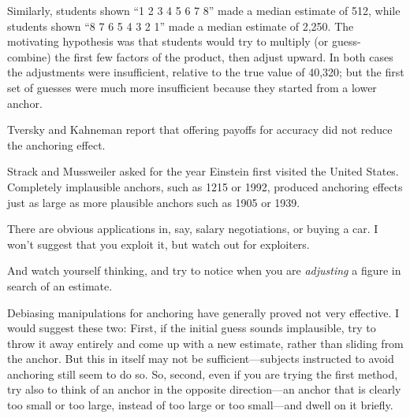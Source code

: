 {
 Similarly, students shown ``1 {\texttimes} 2
{\texttimes} 3 {\texttimes} 4 {\texttimes} 5 {\texttimes} 6
{\texttimes} 7 {\texttimes} 8'' made a median
estimate of 512, while students shown ``8 {\texttimes}
7 {\texttimes} 6 {\texttimes} 5 {\texttimes} 4 {\texttimes} 3
{\texttimes} 2 {\texttimes} 1'' made a median
estimate of 2,250. The motivating hypothesis was that students would
try to multiply (or guess-combine) the first few factors of the
product, then adjust upward. In both cases the adjustments were
insufficient, relative to the true value of 40,320; but the first set
of guesses were much more insufficient because they started from a
lower anchor.}

{
 Tversky and Kahneman report that offering payoffs for accuracy did
not reduce the anchoring effect.}

{
 Strack and Mussweiler asked for the year Einstein first visited
the United States. Completely implausible anchors,
such as 1215 or 1992, produced anchoring effects just as large as more
plausible anchors such as 1905 or 1939.}

{
 There are obvious applications in, say, salary negotiations, or
buying a car. I won't suggest that you exploit it, but
watch out for exploiters.}

{
 And watch yourself thinking, and try to notice when you are
\textit{adjusting} a figure in search of an estimate.}

{
 Debiasing manipulations for anchoring have generally proved not
very effective. I would suggest these two: First, if the initial guess
sounds implausible, try to throw it away entirely and come up with a
new estimate, rather than sliding from the anchor. But this in itself
may not be sufficient---subjects instructed to avoid anchoring still
seem to do so. So, second, even if you are trying
the first method, try also to think of an anchor in the opposite
direction---an anchor that is clearly too small or too large, instead
of too large or too small---and dwell on it briefly.}

\myendsectiontext


\bigskip

